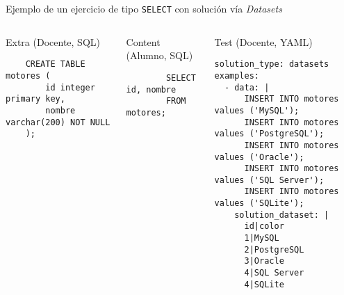 Ejemplo de un ejercicio de tipo \texttt{SELECT} con solución vía \textit{Datasets}

\begin{columns}[t]
    \begin{listing}[H]
        \caption{Extra (Docente, SQL)}
        \begin{verbatim}
    CREATE TABLE motores (
        id integer primary key,
        nombre varchar(200) NOT NULL
    );
        \end{verbatim}
    \end{listing}

    \begin{listing}[H]
        \caption{Content (Alumno, SQL)}
        \begin{verbatim}
        SELECT id, nombre
        FROM motores;
        \end{verbatim}
    \end{listing}

    \begin{listing}[H]
        \caption{Test (Docente, YAML)}
        \begin{verbatim}
solution_type: datasets
examples:
  - data: |
      INSERT INTO motores values ('MySQL');
      INSERT INTO motores values ('PostgreSQL');
      INSERT INTO motores values ('Oracle');
      INSERT INTO motores values ('SQL Server');
      INSERT INTO motores values ('SQLite');
    solution_dataset: |
      id|color
      1|MySQL
      2|PostgreSQL
      3|Oracle
      4|SQL Server
      4|SQLite
        \end{verbatim}
    \end{listing}

\end{columns}
